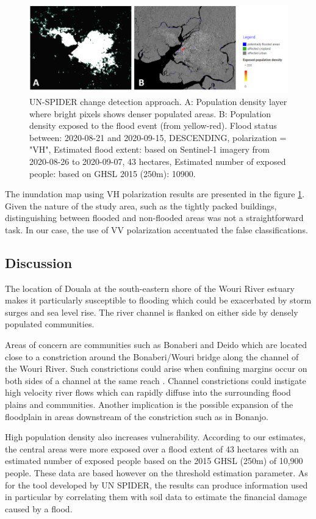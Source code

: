 \begin{figure}[hbt!]
	\centering
	\includegraphics[width=0.8\linewidth]{figure/vh2020.png}
	\caption{UN-SPIDER change detection approach\cite{un-spider}. A: Population density layer where bright pixels shows denser populated areas. B: Population density exposed to the flood event (from yellow-red). Flood status between: 2020-08-21 and 2020-09-15, DESCENDING, polarization = "VH", Estimated flood extent: based on Sentinel-1 imagery from 2020-08-26 to 2020-09-07, 43 hectares, Estimated number of exposed people:
based on GHSL 2015 (250m): 10900.}
	\label{fig:flood_maps}
\end{figure}

The inundation map using VH polarization results are presented in the figure \ref{fig:flood_maps}. Given the nature of the study area, such as the tightly packed buildings, distinguishing between flooded and non-flooded areas was not a straightforward task. In our case, the use of VV polarization accentuated the false classifications.
\subsection{Discussion}
The location of Douala at the south-eastern shore of the Wouri River estuary makes it particularly susceptible to flooding
which could be exacerbated by storm surges and sea level rise. The river
channel is flanked on either side by densely populated communities.

Areas of concern are communities such as Bonaberi and Deido which are
located close to a constriction around the Bonaberi/Wouri bridge along
the channel of the Wouri River. Such constrictions could arise when
confining margins occur on both sides of a channel at the same reach
\cite{EnvironmentAgency2021}. Channel constrictions could instigate
high velocity river flows which can rapidly diffuse into the surrounding
flood plains and communities. Another implication is the possible
expansion of the floodplain in areas downstream of the constriction such
as in Bonanjo. 

High population density also increases vulnerability.  According to our estimates, the central areas were more exposed over a flood extent of 43 hectares with an estimated number of exposed people based on the 2015 GHSL (250m) of 10,900 people.
These data are based however on the threshold estimation parameter. As for the tool developed by UN SPIDER, the results can produce information used in particular by correlating them with soil data to estimate the financial damage caused by a flood.








